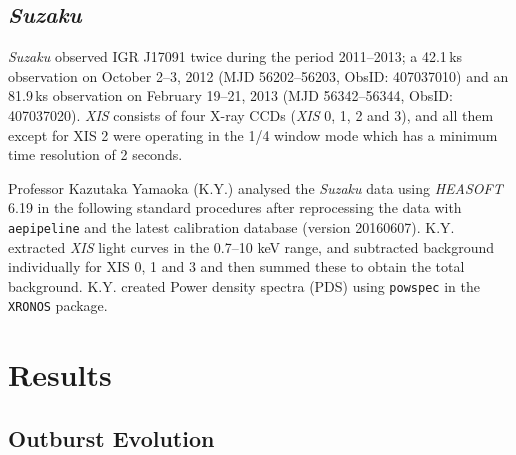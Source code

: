 \subsection{\textit{Suzaku}}

\par \textit{Suzaku} observed IGR J17091 twice during the period 2011--2013; a 42.1\,ks observation on October 2--3, 2012 (MJD 56202--56203, ObsID: 407037010) and an 81.9\,ks observation on February 19--21, 2013 (MJD 56342--56344, ObsID: 407037020). \textit{XIS} consists of four X-ray CCDs (\textit{XIS} 0, 1, 2 and 3), and all them except for XIS 2 were operating in the 1/4 window mode which has a minimum time resolution of 2 seconds.
\par Professor Kazutaka Yamaoka (\textsf{K.Y.}) analysed the \textit{Suzaku} data using {\it HEASOFT} 6.19 in the following standard procedures after reprocessing the data with \texttt{aepipeline} and the latest calibration database (version 20160607).  \textsf{K.Y.} extracted \textit{XIS} light curves in the 0.7--10 keV range, and subtracted background individually for XIS 0, 1 and 3 and then summed these to obtain the total background.  \textsf{K.Y.} created Power density spectra (PDS) using {\tt powspec} in the {\tt XRONOS} package.

\section{Results}
\label{sec:results}

\subsection{Outburst Evolution}

